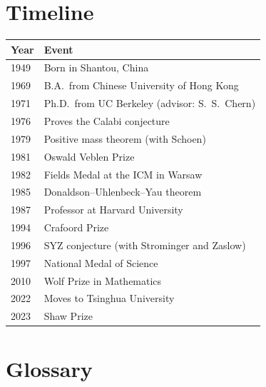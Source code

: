 \section*{Timeline}

\begin{tabularx}{\linewidth}{|p{1.5cm}|>{\raggedright\arraybackslash}X|}
\hline
\textbf{Year} & \textbf{Event} \\ \hline
1949 & Born in Shantou, China \\ \hline
1969 & B.A.\ from Chinese University of Hong Kong \\ \hline
1971 & Ph.D.\ from UC Berkeley (advisor: S.\ S.\ Chern) \\ \hline
1976 & Proves the Calabi conjecture \\ \hline
1979 & Positive mass theorem (with Schoen) \\ \hline
1981 & Oswald Veblen Prize \\ \hline
1982 & Fields Medal at the ICM in Warsaw \\ \hline
1985 & Donaldson--Uhlenbeck--Yau theorem \\ \hline
1987 & Professor at Harvard University \\ \hline
1994 & Crafoord Prize \\ \hline
1996 & SYZ conjecture (with Strominger and Zaslow) \\ \hline
1997 & National Medal of Science \\ \hline
2010 & Wolf Prize in Mathematics \\ \hline
2022 & Moves to Tsinghua University \\ \hline
2023 & Shaw Prize \\ \hline
\end{tabularx}

\section*{Glossary}

